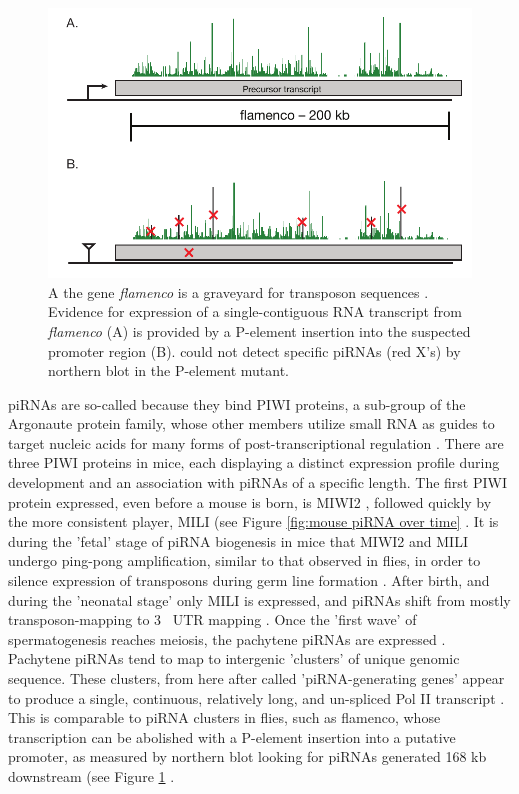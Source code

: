 \begin{figure}[htbp]
	\centering 
	\includegraphics{Figures/FlamencoLocus.pdf}
	\caption[Genetic evidence for long, continuous fly piRNA precursor transcripts]
	{
		A the \flies{} gene \textit{flamenco} is a graveyard for transposon sequences \citep{Pelisson1994}. Evidence for expression of a single-contiguous RNA transcript from \textit{flamenco} (A) is provided by a P-element insertion into the suspected promoter region (B). \citep{Brennecke2007} could not detect specific piRNAs (red X's) by northern blot in the P-element mutant.
	}
	\label{fig:flamenco}
\end{figure}


piRNAs are so-called because they bind PIWI proteins, a sub-group of the Argonaute protein family, whose other members utilize small RNA as guides to target nucleic acids for many forms of post-transcriptional regulation \citep{Siomi2011}. There are three PIWI proteins in mice, each displaying a distinct expression profile during development and an association with piRNAs of a specific length. The first PIWI protein expressed, even before a mouse is born, is MIWI2 \citep{Carmell2007}, followed quickly by the more consistent player, MILI (see Figure \ref{fig:mouse piRNA over time} \citep{Kuramochi-Miyagawa2004, Aravin2006}. It is during the 'fetal' stage of piRNA biogenesis in mice that MIWI2 and MILI undergo ping-pong amplification, similar to that observed in flies, in order to silence expression of transposons during germ line formation \citep{Brennecke2007, Kuramochi-Miyagawa2008}. After birth, and during the 'neonatal stage' only MILI is expressed, and piRNAs shift from mostly transposon-mapping to 3\textprime~ UTR mapping \citep{Robine2009}. Once the 'first wave' of spermatogenesis \citep{Oakberg1956b, Laiho2013a} reaches meiosis, the pachytene piRNAs are expressed \citep{Girard2006, Lau2006, Li2013h}. Pachytene piRNAs tend to map to intergenic 'clusters' of unique genomic sequence. These clusters, from here after called 'piRNA-generating genes' appear to produce a single, continuous, relatively long, and un-spliced Pol II transcript \citep{Li2013h}. This is comparable to piRNA clusters in flies, such as flamenco, whose transcription can be abolished with a P-element insertion into a putative promoter, as measured by northern blot looking for piRNAs generated 168 kb downstream (see Figure \ref{fig:flamenco} \citep{Brennecke2007}. 
 
